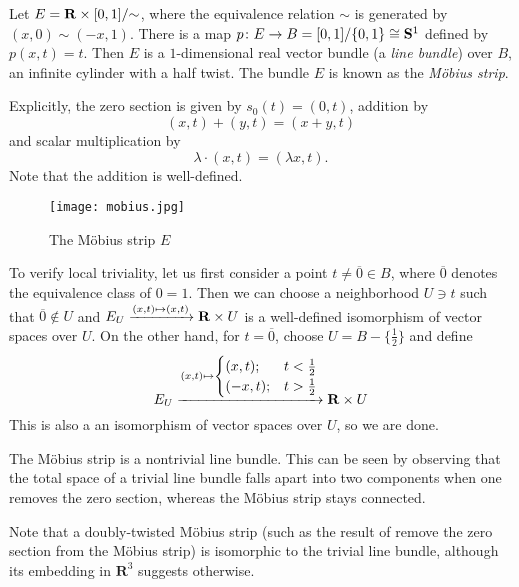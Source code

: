 \documentclass[a4paper,openany]{scrbook}
\begin{document}
\begin{example} \label{exa:mobiusstrip}
Let $E = \R \times [0,1]/\mathord\sim$, where the equivalence relation $\sim$ is generated by $(x,0) \sim (-x,1)$. There is a map $p\colon E \to B = [0,1]/\{0,1\} \cong \S^1$ defined by $p(x,t) = t$. Then $E$ is a $1$-dimensional real vector bundle (a \emph{line bundle}) over $B$, an infinite cylinder with a half twist. The bundle $E$ is known as the \emph{Möbius strip}.

Explicitly, the zero section is given by $s_0(t) = (0,t)$, addition by
\[
(x,t) + (y,t) = (x+y,t)
\]
and scalar multiplication by
\[
\lambda \cdot (x,t) = (\lambda x,t).
\]
Note that the addition is well-defined. 

\begin{figure}[h]
\begin{center}\texttt{[image: mobius.jpg]}\end{center}
\caption{The Möbius strip $E$}
\end{figure}

To verify local triviality, let us first consider a point $t \neq \overline 0 \in B$, where $\overline 0$ denotes the equivalence class of $0=1$. Then we can choose a neighborhood $U \ni t$ such that $\overline 0 \not\in U$ and $E_U \xrightarrow{(x,t) \mapsto (x,t)} \R \times U$ is a well-defined isomorphism of vector spaces over $U$. On the other hand, for $t = \overline 0$, choose $U = B-\{\frac12\}$ and define
\[
E_U \xrightarrow{(x,t) \mapsto \begin{cases} (x,t); & t<\frac12\\ (-x,t); & t>\frac12\end{cases}} \R \times U
\]
This is also a an isomorphism of vector spaces over $U$, so we are done.

The Möbius strip is a nontrivial line bundle. This can be seen by observing that the total space of a trivial line bundle falls apart into two components when one removes the zero section, whereas the Möbius strip stays connected.

Note that a doubly-twisted Möbius strip (such as the result of remove the zero section from the Möbius strip) is isomorphic to the trivial line bundle, although its embedding in $\mathbf R^3$ suggests otherwise.
\end{example}
\end{document}
